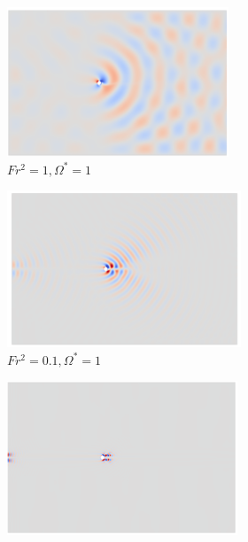 \begin{figure}
    \begin{subfigure}[b]{0.32\textwidth}
        \centering
        \includegraphics[width=\textwidth]{images/circle/av1fr1.png}
        \caption{$Fr^2 = 1, \Omega^{\ast} = 1$}
        \label{fig:av1frs1}
    \end{subfigure}
    \hfill
    \begin{subfigure}[b]{0.32\textwidth}
        \centering
        \includegraphics[width=\textwidth]{images/circle/av1fr0p3.png}
        \caption{$Fr^2 = 0.1, \Omega^{\ast} = 1$}
        \label{fig:av1frs0p1}
    \end{subfigure}
    \hfill
    \begin{subfigure}[b]{0.32\textwidth}
        \centering
        \includegraphics[width=\textwidth]{images/circle/av1fr0p1.png}

\end{subfigure}
\end{figure}
